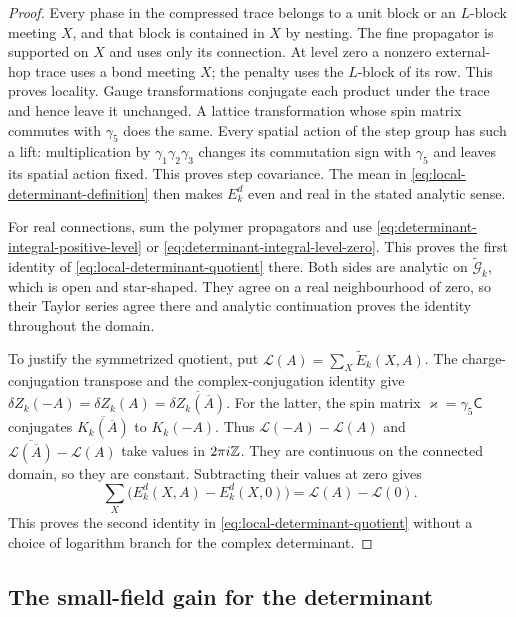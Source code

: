 \begin{proof}
Every phase in the compressed trace belongs to a unit block or an
$L$-block meeting $X$, and that block is contained in $X$ by
nesting. The fine propagator is supported on $X$ and uses only its
connection. At level zero a nonzero external-hop trace uses a bond
meeting $X$; the penalty uses the $L$-block of its row. This proves
locality. Gauge transformations conjugate each product under the
trace and hence leave it unchanged. A lattice transformation whose
spin matrix commutes with $\gamma_5$ does the same. Every spatial
action of the step group has such a lift: multiplication by
$\gamma_1\gamma_2\gamma_3$ changes its commutation sign with
$\gamma_5$ and leaves its spatial action fixed. This proves step
covariance. The mean in \eqref{eq:local-determinant-definition}
then makes $E_k^d$ even and real in the stated analytic sense.

For real connections, sum the polymer propagators and use
\eqref{eq:determinant-integral-positive-level} or
\eqref{eq:determinant-integral-level-zero}. This proves the first
identity of \eqref{eq:local-determinant-quotient} there. Both sides
are analytic on $\widetilde{\mathcal G}_k$, which is open and
star-shaped. They agree on a real neighbourhood of zero, so their
Taylor series agree there and analytic continuation proves the
identity throughout the domain.

To justify the symmetrized quotient, put
$\mathcal L(A)=\sum_X\widetilde E_k(X,A)$.
The charge-conjugation transpose and the complex-conjugation
identity give
$\delta Z_k(-A)=\delta Z_k(A)
=\overline{\delta Z_k(\overline A)}$.
For the latter, the spin matrix $\varkappa=\gamma_5\mathsf C$
conjugates $\overline{K_k(\overline A)}$ to $K_k(-A)$.
Thus $\mathcal L(-A)-\mathcal L(A)$ and
$\overline{\mathcal L(\overline A)}-\mathcal L(A)$ take values
in $2\pi i\mathbb Z$. They are continuous on the connected domain,
so they are constant. Subtracting their values at zero gives
\[
 \sum_X\bigl(E_k^d(X,A)-E_k^d(X,0)\bigr)
                            =\mathcal L(A)-\mathcal L(0).
\]
This proves the second identity in
\eqref{eq:local-determinant-quotient} without a choice of logarithm
branch for the complex determinant.
\end{proof}

\subsection{The small-field gain for the determinant}\label{subsec:determinant-small-field-gain}

